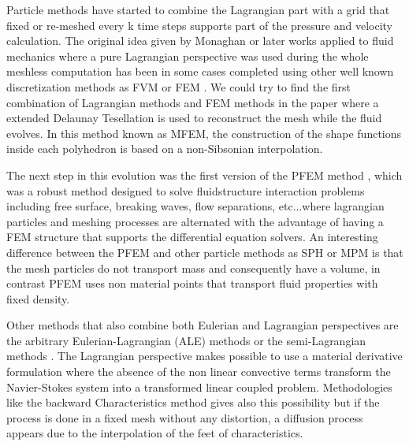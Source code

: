 \documentclass[a4paper,conference]{IEEEtran}
\begin{document}

Particle methods have started to combine the Lagrangian part with a grid that fixed or re-meshed every k time steps supports part of the pressure and velocity calculation. The original idea given by Monaghan \cite{Mon77} or later works applied to fluid mechanics \cite{Monaghan88} where a pure Lagrangian perspective was used during the whole meshless computation has been in some cases completed using other well known discretization methods as FVM \cite{Quinlan} or FEM \cite{Calvo}. We could try to find the first combination of Lagrangian methods and FEM methods in the paper \cite{Ide03b} where a extended Delaunay Tesellation is used to reconstruct the mesh while the fluid evolves. In this method known as MFEM, the construction of the shape functions inside each polyhedron is based on a non-Sibsonian interpolation.

The next step in this evolution was the first version of the PFEM method \cite{Idelsohn04}, which was a robust method designed to solve fluidstructure interaction problems including free surface, breaking waves, flow separations, etc...where lagrangian particles and meshing processes are alternated with the advantage of having a FEM structure that supports the differential equation solvers. An interesting difference between the PFEM and other particle methods as SPH or MPM \cite{Wieckowsky04} is that the mesh particles do not transport mass and consequently have a volume, in contrast PFEM uses non material points that transport fluid properties with fixed density. 

Other methods that also combine both Eulerian and Lagrangian perspectives are the arbitrary Eulerian-Lagrangian (ALE)\cite{Donea83} methods or the semi-Lagrangian methods \cite{Bermejo}. The Lagrangian perspective makes possible to use a material derivative formulation where the absence of the non linear convective terms transform the Navier-Stokes system into a transformed linear coupled problem. Methodologies like the backward Characteristics method \cite{Bermejo} gives also this possibility but if the process is done in a fixed mesh without any distortion, a diffusion process appears due to the interpolation of the feet of characteristics.
\end{document}
